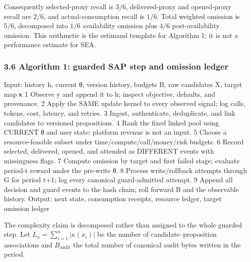 \documentclass[
  11pt]{article}
\newenvironment{Shaded}{}{}
\newcommand{\NormalTok}[1]{#1}
\begin{document}
Consequently selected-proxy recall is \(3/6\), delivered-proxy and
opened-proxy recall are \(2/6\), and actual-consumption recall is
\(1/6\). Total weighted omission is \(5/6\), decomposed into \(1/6\)
availability omission plus \(4/6\) post-availability omission. This
arithmetic is the estimand template for Algorithm 1; it is not a
performance estimate for SEA.

\subsubsection{3.6 Algorithm 1: guarded SAP step and omission
ledger}\label{algorithm-1-guarded-sap-step-and-omission-ledger}

\begin{Shaded}
\begin{Highlighting}[]
\NormalTok{Input: history h, current θ, version history, budgets B,}
\NormalTok{       raw candidates X, target map κ}
\NormalTok{1  Observe y and append it to h;}
\NormalTok{   inspect objective, defaults, and provenance.}
\NormalTok{2  Apply the SAME update kernel to every observed signal;}
\NormalTok{   log calls, tokens, cost, latency, and retries.}
\NormalTok{3  Ingest, authenticate, deduplicate, and link candidates}
\NormalTok{   to versioned propositions.}
\NormalTok{4  Rank the fixed linked pool using CURRENT θ and user state;}
\NormalTok{   platform revenue is not an input.}
\NormalTok{5  Choose a resource{-}feasible subset under}
\NormalTok{   time/compute/call/money/risk budgets.}
\NormalTok{6  Record selected, delivered, opened, and attended as}
\NormalTok{   DIFFERENT events with missingness flags.}
\NormalTok{7  Compute omission by target and first failed stage;}
\NormalTok{   evaluate period{-}t reward under the pre{-}write θ.}
\NormalTok{8  Process write/rollback attempts through G for period t+1;}
\NormalTok{   log every canonical guard{-}admitted attempt.}
\NormalTok{9  Append all decision and guard events to the hash chain;}
\NormalTok{   roll forward B and the observable history.}
\NormalTok{Output: next state, consumption receipts,}
\NormalTok{        resource ledger, target omission ledger}
\end{Highlighting}
\end{Shaded}

The complexity claim is decomposed rather than assigned to the whole
guarded step. Let \(L_\kappa=\sum_{i=1}^n|\kappa(x_i)|\) be the number
of candidate--proposition associations and \(B_{\mathrm{audit}}\) the
total number of canonical audit bytes written in the period.
\end{document}
